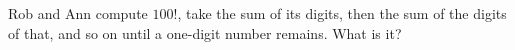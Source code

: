 Rob and Ann compute $100!$, take the sum of its digits, then the sum of the digits of that, and so on until a one-digit number remains. What is it?
